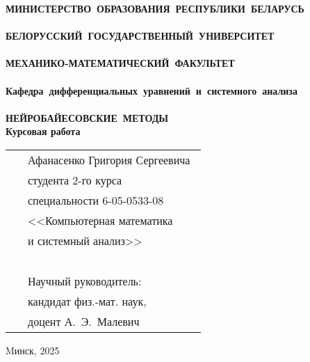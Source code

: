 \setcounter{page}{1}
\thispagestyle{empty}
\begin{center}
\bf
\vspace{4cm}
{
\mbox{МИНИСТЕРСТВО~ОБРАЗОВАНИЯ~РЕСПУБЛИКИ~БЕЛАРУСЬ} \\~\\
\mbox{БЕЛОРУССКИЙ~ГОСУДАРСТВЕННЫЙ~УНИВЕРСИТЕТ} \\~\\
\mbox{МЕХАНИКО-МАТЕМАТИЧЕСКИЙ~ФАКУЛЬТЕТ} \\~\\
\mbox{Кафедра~дифференциальных~уравнений~и~системного~анализа} \\~\\
}
\vspace{4cm}
\bf
\mbox{НЕЙРОБАЙЕСОВСКИЕ МЕТОДЫ}\\
\vspace{1cm}
\rm Курсовая работа
\vspace{3cm}
\end{center}

\begin{tabular}{ll}
\hspace{10.5cm}
&Афанасенко Григория Сергеевича~\\
&студента 2-го курса\\
&специальности 6-05-0533-08\\
&<<Компьютерная математика\\
&и системный анализ>>\\~\\
&Научный руководитель:\\
&кандидат физ.-мат. наук,\\
&доцент А.~Э.~Малевич
\end{tabular}
\vspace{4cm}
\begin{center}
    Mинск, 2025
\end{center}
\clearpage
\restoregeometry
